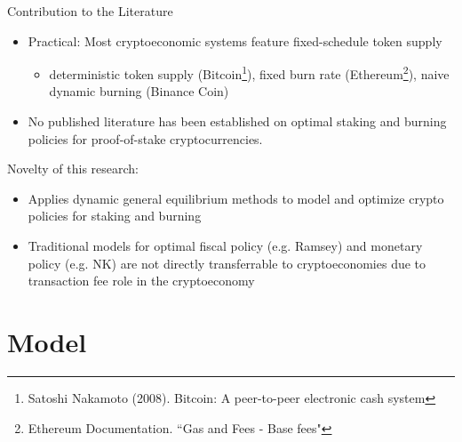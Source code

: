 \documentclass{beamer}
\begin{document}
\begin{frame}{Contribution to the Literature}
\begin{itemize}
    \item Practical: Most cryptoeconomic systems feature fixed-schedule token supply
    \begin{itemize}
        \item deterministic token supply (Bitcoin\footnote{Satoshi Nakamoto (2008). Bitcoin: A peer-to-peer electronic cash system}), 
        fixed burn rate (Ethereum\footnote{Ethereum Documentation. ``Gas and Fees - Base fees"}), 
        naive dynamic burning (Binance Coin)
    \end{itemize}

    \item No published literature has been established on optimal staking and burning policies for proof-of-stake cryptocurrencies.
\end{itemize}
Novelty of this research:
\begin{itemize}
    \item Applies dynamic general equilibrium methods to model and optimize crypto policies for staking and burning            
      \item Traditional models for optimal fiscal policy (e.g. Ramsey) and monetary policy (e.g. NK) are not directly transferrable to cryptoeconomies due to transaction fee role in the cryptoeconomy
  
\end{itemize}
\end{frame}





\section{Model}
\end{document}
